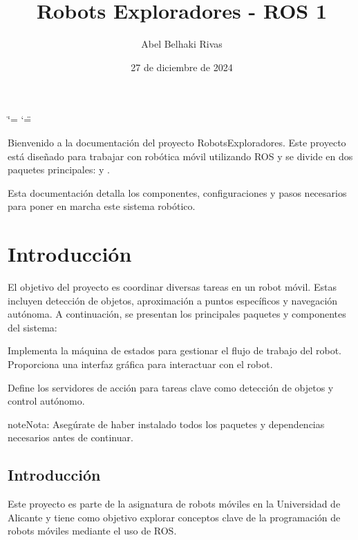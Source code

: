 \documentclass[a4paper,10pt,spanish]{sphinxmanual}
\title{Robots Exploradores - ROS 1}
\date{27 de diciembre de 2024}
\author{Abel Belhaki Rivas}
\begin{document}
\ifdefined\shorthandoff
  \ifnum\catcode`\=\string=\active\shorthandoff{=}\fi
  \ifnum\catcode`\"=\active{}\fi
\fi

\pagestyle{empty}
\sphinxmaketitle
\pagestyle{plain}
\sphinxtableofcontents
\pagestyle{normal}
\label{\detokenize{index::doc}}


\sphinxAtStartPar
Bienvenido a la documentación del proyecto RobotsExploradores. Este proyecto está diseñado para trabajar con robótica móvil utilizando ROS y se divide en dos paquetes principales:  y .

\sphinxAtStartPar
Esta documentación detalla los componentes, configuraciones y pasos necesarios para poner en marcha este sistema robótico.


\chapter{Introducción}
\label{\detokenize{index:introduccion}}
\sphinxAtStartPar
El objetivo del proyecto es coordinar diversas tareas en un robot móvil. Estas incluyen detección de objetos, aproximación a puntos específicos y navegación autónoma. A continuación, se presentan los principales paquetes y componentes del sistema:

\sphinxAtStartPar
{}
\sphinxhyphen{} Implementa la máquina de estados para gestionar el flujo de trabajo del robot.
\sphinxhyphen{} Proporciona una interfaz gráfica para interactuar con el robot.

\sphinxAtStartPar
{}
\sphinxhyphen{} Define los servidores de acción para tareas clave como detección de objetos y control autónomo.

\begin{sphinxadmonition}{note}{Nota:}
\sphinxAtStartPar
Asegúrate de haber instalado todos los paquetes y dependencias necesarios antes de continuar.
\end{sphinxadmonition}

\sphinxstepscope


\section{Introducción}
\label{\detokenize{introduccion:introduccion}}\label{\detokenize{introduccion::doc}}
\sphinxAtStartPar
Este proyecto es parte de la asignatura de robots móviles en la Universidad de Alicante y tiene como objetivo explorar conceptos clave de la programación de robots móviles mediante el uso de ROS.
\end{document}
